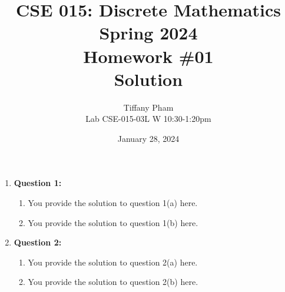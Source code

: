 \documentclass[11pt]{article}
\begin{document}
\author{Tiffany Pham\\
Lab CSE-015-03L W 10:30-1:20pm}
\title{CSE 015: Discrete Mathematics\\
Spring 2024\\
Homework \#01\\
Solution}
\date{January 28, 2024}
\maketitle
\begin{enumerate}
\item
\textbf{Question 1:}
\begin{enumerate}[label=(\alph*)]
\item
You provide the solution to question 1(a) here.
\item
You provide the solution to question 1(b) here.
\end{enumerate}
\item
\textbf{Question 2:}
\begin{enumerate}[label=(\alph*)]
\item
You provide the solution to question 2(a) here.
\item
You provide the solution to question 2(b) here.
\end{enumerate}
\end{enumerate}
\end{document}
